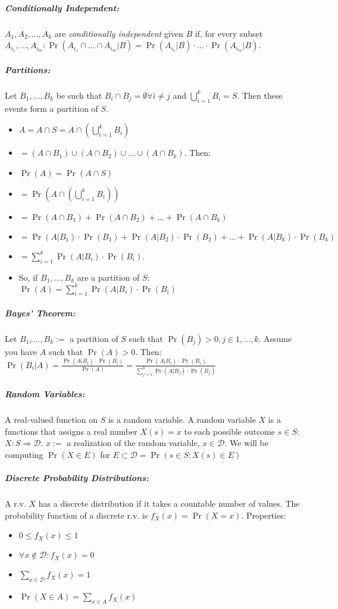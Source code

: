 \documentclass[landscape,10pt]{article}
\begin{document}
\begin{multicols}{4}
    \subparagraph*{Conditionally Independent: } 
        \(A_1, A_2, \ldots, A_k\) are \textit{conditionally independent} given \(B\) if, for every subset \(A_{i_1}, \ldots, A_{i_m}: \Pr(A_{i_1} \cap \ldots \cap A_{i_m} | B) = \Pr(A_{i_1} | B) \cdot \ldots \cdot \Pr(A_{i_m} | B)\).

    \subparagraph*{Partitions: }
        Let \(B_1, \ldots, B_k\) be such that \(B_i \cap B_j = \emptyset \forall i \neq j\) and \(\bigcup_{i = 1}^{k} B_i = S\). Then these events form a partition of \(S\).
        \begin{itemize}
            \item[] \(A = A \cap S = A \cap \left(\bigcup_{i = 1}^{k} B_i\right) \)
            \item[] \(= (A \cap B_1) \cup (A \cap B_2) \cup \ldots \cup (A \cap B_k)\). Then: 
            \item[] \(\Pr(A) = \Pr(A \cap S) \)
            \item[] \(= \Pr(A \cap \left(\bigcup_{i = 1}^{k} B_i \right)) \)
            \item[] \(= \Pr(A \cap B_1) + \Pr(A \cap B_2) + \ldots + \Pr(A \cap B_k)\)
            \item[] \(=\Pr(A|B_1) \cdot \Pr(B_1) + \Pr(A|B_2)\cdot \Pr(B_2) + \ldots + \Pr(A|B_k) \cdot \Pr(B_k) \)
            \item[] \(= \sum_{i=1}^{k} \Pr(A|B_i)\cdot \Pr(B_i)\). 
            \item[]So, if \(B_1, \ldots, B_k\) are a partition of \(S\): \(\Pr(A) = \sum_{i=1}^{k}\Pr(A|B_i)\cdot \Pr(B_i)\)
        \end{itemize}

    \subparagraph*{Bayes' Theorem:}
        Let \(B_1, \ldots, B_k :=\) a partition of \(S\) such that \(\Pr(B_j) > 0, j \in 1, \ldots, k\). Assume you have \(A\) such that \(\Pr(A) > 0\). Then: \(\Pr(B_i|A) = \frac{\Pr(A|B_i) \cdot \Pr(B_i)}{\Pr(A)} = \frac{\Pr(A|B_i) \cdot \Pr(B_i)}{\sum\limits_{j=1}^{k}\Pr(A|B_j) \cdot \Pr(B_j)}\)

    \subparagraph*{Random Variables:}
        A real-valued function on \(S\) is a  random variable. A random variable \(X\) is a functions that assigns a real number \(X(s)=x\) to each possible outcome \(s \in S\): \(X:S \Rightarrow \mathcal{D}\). \(x:=\) a realization of the random variable, \(x \in \mathcal{D}\). We will be computing \(\Pr(X \in E)\) for \(E \subset \mathcal{D} = \Pr(s \in S: X(s) \in E)\)
    
    \subparagraph*{Discrete Probability Distributions: }
    A r.v. \(X\) has a discrete distribution if it takes a countable number of values. The probability function of a discrete r.v. is \(f_X(x) = \Pr(X=x)\). Properties:
    \begin{itemize}
        \item[] \(0 \leq f_X(x) \leq 1\)
        \item[] \(\forall x \notin \mathcal{D}: f_X(x) = 0\)
        \item[] \(\sum\limits_{x \in \mathcal{D}} f_X(x) = 1\)
        \item[] \(\Pr(X \in A) = \sum\limits_{x \in A} f_X (x)\)
    \end{itemize}


\end{multicols}
\end{document}
